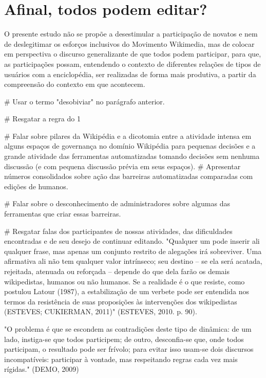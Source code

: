 \section{Afinal, todos podem editar?}

O presente estudo não se propõe a desestimular a participação de novatos e nem de deslegitimar os esforços inclusivos do Movimento Wikimedia, mas de colocar em perspectiva o discurso generalizante de que todos podem participar, para que, as participações possam, entendendo o contexto de diferentes relações de tipos de usuários com a enciclopédia, ser realizadas de forma mais produtiva, a partir da compreensão do contexto em que acontecem.

# Usar o termo "desobiviar" no parágrafo anterior.

# Resgatar a regra do 1%

# Falar sobre pilares da Wikipédia e a dicotomia entre a atividade intensa em alguns espaços de governança no domínio Wikipédia para pequenas decisões e a grande atividade das ferramentas automatizadas tomando decisões sem nenhuma discussão (e com pequena discussão prévia em seus espaços).
# Apresentar números consolidados sobre ação das barreiras automatizadas comparadas com edições de humanos.

# Falar sobre o desconhecimento de administradores sobre algumas das ferramentas que criar essas barreiras.

# Resgatar falas dos participantes de nossas atividades, das dificuldades encontradas e de seu desejo de continuar editando.
"Qualquer um pode inserir ali qualquer frase, mas apenas um conjunto restrito de alegações irá sobreviver. Uma afirmativa ali não tem qualquer valor intrínseco; seu destino – se ela será acatada, rejeitada, atenuada ou reforçada – depende do que dela farão os demais wikipedistas, humanos ou não humanos. Se a realidade é o que resiste, como postulou Latour (1987), a estabilização de um verbete pode ser entendida nos termos da resistência de suas proposições às intervenções dos wikipedistas (ESTEVES; CUKIERMAN, 2011)" (ESTEVES, 2010. p. 90).

"O problema é que se escondem as contradições deste tipo de dinâmica: de um lado, instiga-se que todos participem; de outro, desconfia-se que, onde todos participam, o resultado pode ser frívolo; para evitar isso usam-se dois discursos incompatíveis: participar à vontade, mas respeitando regras cada vez mais rígidas." (DEMO, 2009)

